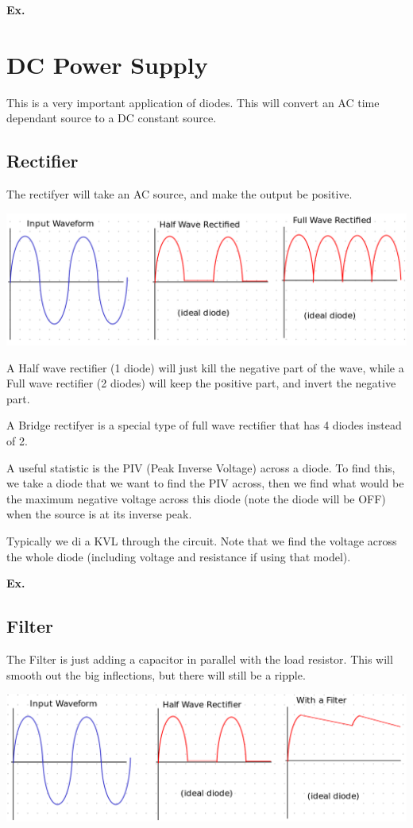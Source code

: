 \documentclass[12pt,letterpaper]{article} \usepackage{amsmath} \usepackage{graphicx} \usepackage[margin=1in]{geometry} \usepackage{longtable}  \usepackage{amssymb}
\begin{document}
	\begin{mdframed}[]
	\textbf{Ex. }
	\end{mdframed}
	
	\section{DC Power Supply}
	This is a very important application of diodes. This will convert an AC time dependant source to a DC constant source. 
	
	\subsection{Rectifier}
	The rectifyer will take an AC source, and make the output be positive.
	\begin{center}
		\includegraphics[width=0.9\linewidth]{rectifier}
	\end{center}
	
	
	A Half wave rectifier (1 diode) will just kill the negative part of the wave, while a Full wave rectifier (2 diodes) will keep the positive part, and invert the negative part. 
	
	A Bridge rectifyer is a special type of full wave rectifier that has 4 diodes instead of 2. 
	
	A useful statistic is the PIV (Peak Inverse Voltage) across a diode. To find this, we take a diode that we want to find the PIV across, then we find what would be the maximum negative voltage across this diode (note the diode will be OFF) when the source is at its inverse peak. 
	
	Typically we di a KVL through the circuit. Note that we find the voltage across the whole diode (including voltage and resistance if using that model).
	
	\begin{mdframed}[]
	\textbf{Ex. }
	\end{mdframed}
	
	\subsection{Filter}
	The Filter is just adding a capacitor in parallel with the load resistor. This will smooth out the big inflections, but there will still be a ripple. 
	\begin{center}
		\includegraphics[width=0.9\linewidth]{filter}
	\end{center}
\end{document}
